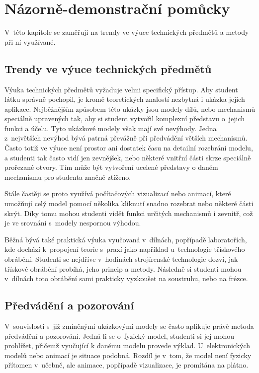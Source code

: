 \chapter{Názorně-demonstrační pomůcky}
V~této kapitole se zaměřuji na trendy ve výuce technických předmětů a metody při ní využívané.

\section{Trendy ve výuce technických předmětů}
Výuka technických předmětů vyžaduje velmi specifický přístup.
Aby student látku správně pochopil, je kromě teoretických znalostí nezbytná i ukázka jejich aplikace.
Nejběžnějším způsobem této ukázky jsou modely dílů, nebo mechanismů speciálně upravených tak, aby si student vytvořil komplexní představu o~jejich funkci a účelu.
Tyto ukázkové modely však mají své nevýhody. 
Jedna z~největších nevýhod bývá patrná převážně při předvádění větších mechanismů.
Často totiž ve výuce není prostor ani dostatek času na detailní rozebrání modelu, a studenti tak často vidí jen zevnějšek, nebo některé vnitřní části skrze speciálně prořezané otvory.
Tím může být vytvoření ucelené představy o daném mechanismu pro studenta značně ztíženo.

Stále častěji se proto využívá počítačových vizualizací nebo animací, které umožňují celý model pomocí několika kliknutí snadno rozebrat nebo některé části skrýt. 
Díky tomu mohou studenti vidět funkci určitých mechanismů i zevnitř, což je ve srovnání s~modely nespornou výhodou.

Běžná bývá také praktická výuka vyučovaná v~dílnách, popřípadě laboratořích, kde dochází k~propojení teorie s~praxí jako například u~technologie třískového obrábění.
Studenti se nejdříve v~hodinách strojírenské technologie dozví, jak třískové obrábění probíhá, jeho princip a metody.
Následně si studenti mohou v~dílnách toto obrábění sami prakticky vyzkoušet na soustruhu, nebo na frézce.

\section{Předvádění a pozorování}
V~souvislosti s~již zmíněnými ukázkovými modely se často aplikuje právě metoda předvádění a pozorování.
Jedná-li se o~fyzický model, studenti si jej mohou prohlížet, přičemž vyučující k danému modelu provede výklad.
U~elektronických modelů nebo animací je situace podobná.
Rozdíl je v~tom, že model není fyzicky přítomen v~učebně, ale animace, popřípadě vizualizace, je promítána na plátno.

